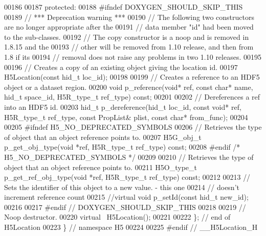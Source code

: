 \begin{DoxyCode}
00186 
00187    \textcolor{keyword}{protected}:
00188 \textcolor{preprocessor}{#ifndef DOXYGEN\_SHOULD\_SKIP\_THIS}
00189         \textcolor{comment}{// *** Deprecation warning ***}
00190         \textcolor{comment}{// The following two constructors are no longer appropriate after the}
00191         \textcolor{comment}{// data member "id" had been moved to the sub-classes.}
00192         \textcolor{comment}{// The copy constructor is a noop and is removed in 1.8.15 and the}
00193         \textcolor{comment}{// other will be removed from 1.10 release, and then from 1.8 if its}
00194         \textcolor{comment}{// removal does not raise any problems in two 1.10 releases.}
00195 
00196         \textcolor{comment}{// Creates a copy of an existing object giving the location id.}
00197         H5Location(\textcolor{keyword}{const} hid\_t loc\_id);
00198 
00199         \textcolor{comment}{// Creates a reference to an HDF5 object or a dataset region.}
00200         \textcolor{keywordtype}{void} p\_reference(\textcolor{keywordtype}{void}* ref, \textcolor{keyword}{const} \textcolor{keywordtype}{char}* name, hid\_t space\_id, H5R\_type\_t ref\_type) \textcolor{keyword}{const};
00201 
00202         \textcolor{comment}{// Dereferences a ref into an HDF5 id.}
00203         hid\_t p\_dereference(hid\_t loc\_id, \textcolor{keyword}{const} \textcolor{keywordtype}{void}* ref, H5R\_type\_t ref\_type, \textcolor{keyword}{const} PropList& plist, \textcolor{keyword}{
      const} \textcolor{keywordtype}{char}* from\_func);
00204 
00205 \textcolor{preprocessor}{#ifndef H5\_NO\_DEPRECATED\_SYMBOLS}
00206         \textcolor{comment}{// Retrieves the type of object that an object reference points to.}
00207         H5G\_obj\_t p\_get\_obj\_type(\textcolor{keywordtype}{void} *ref, H5R\_type\_t ref\_type) \textcolor{keyword}{const};
00208 \textcolor{preprocessor}{#endif }\textcolor{comment}{/* H5\_NO\_DEPRECATED\_SYMBOLS */}\textcolor{preprocessor}{}
00209 
00210         \textcolor{comment}{// Retrieves the type of object that an object reference points to.}
00211         H5O\_type\_t p\_get\_ref\_obj\_type(\textcolor{keywordtype}{void} *ref, H5R\_type\_t ref\_type) \textcolor{keyword}{const};
00212 
00213         \textcolor{comment}{// Sets the identifier of this object to a new value. - this one}
00214         \textcolor{comment}{// doesn't increment reference count}
00215         \textcolor{comment}{//virtual void p\_setId(const hid\_t new\_id);}
00216 
00217 \textcolor{preprocessor}{#endif // DOXYGEN\_SHOULD\_SKIP\_THIS}
00218 
00219         \textcolor{comment}{// Noop destructor.}
00220         \textcolor{keyword}{virtual} ~H5Location();
00221 
00222 \}; \textcolor{comment}{// end of H5Location}
00223 \} \textcolor{comment}{// namespace H5}
00224 
00225 \textcolor{preprocessor}{#endif // \_\_H5Location\_H}
\end{DoxyCode}
